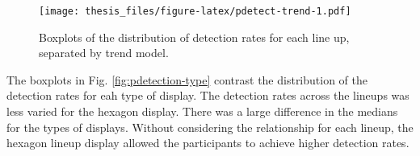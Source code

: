 \documentclass{monashthesis}
\begin{document}
\begin{Shaded}
\end{Shaded}

\begin{figure}
\centering
\texttt{[image: thesis\_files/figure-latex/pdetect-trend-1.pdf]}
\caption{\label{fig:pdetect-trend}Boxplots of the distribution of detection rates for each line up, separated by trend model.}
\end{figure}

The boxplots in Fig. \ref{fig:pdetection-type} contrast the distribution of the detection rates for eah type of display.
The detection rates across the lineups was less varied for the hexagon display. There was a large difference in the medians for the types of displays.
Without considering the relationship for each lineup, the hexagon lineup display allowed the participants to achieve higher detection rates.

\begin{Shaded}
\end{Shaded}
\end{document}
